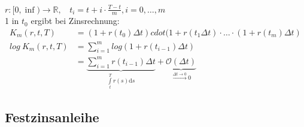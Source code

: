 \begin{enumerate}[(a)]
	\\
	$r:[0,\inf) \to \mathds{R},~~~~t_i= t+i\cdot \frac{T-t}{m}, i=0,\dots,m$\\
	1 \texteuro in $t_0$ ergibt bei Zinsrechnung:\\
	\begin{equation*}
	\begin{aligned}
		K_m(r,t,T) &= (1+r(t_0)\Delta t)cdot(1+r(t_1\Delta t)\cdot \dots \cdot(1+r(t_m)\Delta t) \\
		log~K_m(r,t,T) &= \sum_{i=1}^{m}log(1+r(t_{i-1})\Delta t) \\
		&= \underbrace{\sum_{i=1}^{m}r(t_{i-1})\Delta t}_{\int\limits_{t}^{T}r(s)\mathrm{d}s} +\underbrace{\mathcal{O}(\Delta t)}_{\stackrel{\Delta t \to 0}{\longrightarrow} 0}
	\end{aligned}
	\end{equation*}
\end{enumerate}

\subsection{Festzinsanleihe}
\label{sub:festzinsanleihe}

